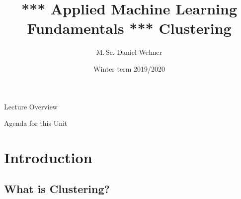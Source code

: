 


\title[Clustering]{*** Applied Machine Learning Fundamentals *** Clustering}
\author{M.\,Sc. Daniel Wehner}
\date{Winter term 2019/2020}




\maketitlepage


\begin{frame}{Lecture Overview}{}
\end{frame}


\begin{frame}{Agenda for this Unit}
	\begin{multicols}{2}
		\tableofcontents
	\end{multicols}
\end{frame}


\section{Introduction}

\subsection{What is Clustering?}


